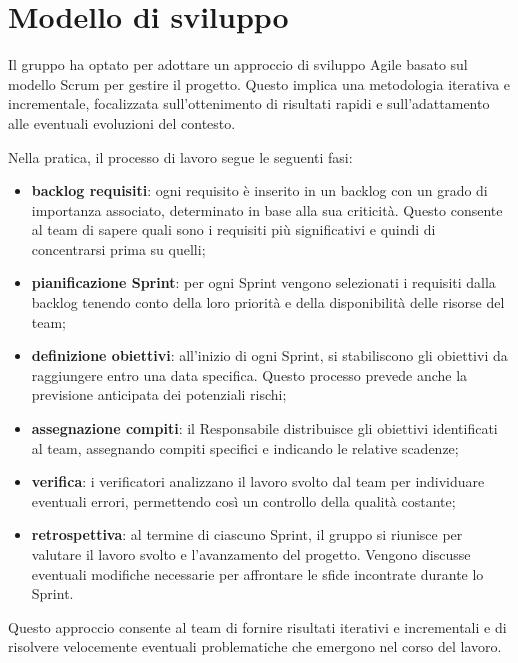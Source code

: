 \section{Modello di sviluppo} \label{sec:modello-sviluppo}
Il gruppo ha optato per adottare un approccio di sviluppo Agile basato sul modello Scrum per gestire il progetto. 
Questo implica una metodologia iterativa e incrementale, focalizzata sull'ottenimento di risultati rapidi e sull'adattamento alle eventuali evoluzioni del contesto.
 
Nella pratica, il processo di lavoro segue le seguenti fasi:
\begin{itemize}
    \item \textbf{backlog requisiti}: ogni requisito è inserito in un backlog con un grado di importanza associato, determinato in base alla sua criticità. Questo consente al team di sapere quali sono i requisiti più significativi e quindi di concentrarsi prima su quelli;
    \item \textbf{pianificazione Sprint}: per ogni Sprint vengono selezionati i requisiti dalla backlog tenendo conto della loro priorità e della disponibilità delle risorse del team;
    \item \textbf{definizione obiettivi}: all'inizio di ogni Sprint, si stabiliscono gli obiettivi da raggiungere entro una data specifica. Questo processo prevede anche la previsione anticipata dei potenziali rischi;
    \item \textbf{assegnazione compiti}: il Responsabile distribuisce gli obiettivi identificati al team, assegnando compiti specifici e indicando le relative scadenze;
    \item \textbf{verifica}: i verificatori analizzano il lavoro svolto dal team per individuare eventuali errori, permettendo così un controllo della qualità costante;
    \item \textbf{retrospettiva}: al termine di ciascuno Sprint, il gruppo si riunisce per valutare il lavoro svolto e l'avanzamento del progetto. Vengono discusse eventuali modifiche necessarie per affrontare le sfide incontrate durante lo Sprint.
\end{itemize}

Questo approccio consente al team di fornire risultati iterativi e incrementali e di risolvere velocemente eventuali problematiche che emergono nel corso del lavoro.
